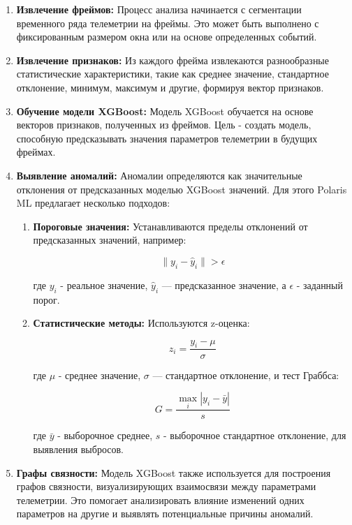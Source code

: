\documentclass[14pt, a4paper]{../cls/coursework}
\begin{document}
    \begin{enumerate}[label=\arabic*.]
        \item \textbf{Извлечение фреймов:} Процесс анализа начинается с сегментации временного ряда телеметрии на фреймы.
        Это может быть выполнено с фиксированным размером окна или на основе определенных событий.
        \item \textbf{Извлечение признаков:} Из каждого фрейма извлекаются разнообразные статистические характеристики, такие как среднее значение, стандартное отклонение, минимум, максимум и другие, формируя вектор признаков.
        \item \textbf{Обучение модели XGBoost:} Модель XGBoost обучается на основе векторов признаков, полученных из фреймов.
        Цель - создать модель, способную предсказывать значения параметров телеметрии в будущих фреймах.
        \item \textbf{Выявление аномалий:} Аномалии определяются как значительные отклонения от предсказанных моделью XGBoost значений.
        Для этого Polaris ML предлагает несколько подходов:
        \begin{enumerate}[label=\alph*.]
            \item \textbf{Пороговые значения:} Устанавливаются пределы отклонений от предсказанных значений, например:

            \[\| y_i - \hat{y}_i \| > \epsilon\]

            где $y_i$ - реальное значение, $\hat{y}_i$ — предсказанное значение, а $\epsilon$ - заданный порог.
            \item \textbf{Статистические методы:} Используются z-оценка:

            \[z_i = \frac{y_i - \mu}{\sigma}\]

            где $\mu$ - среднее значение, $\sigma$ — стандартное отклонение, и тест Граббса:

            \[G = \frac{\max_{i}|y_i - \bar{y}|}{s}\]

            где $\bar{y}$ - выборочное среднее, $s$ - выборочное стандартное отклонение, для выявления выбросов.
        \end{enumerate}
        \item \textbf{Графы связности:} Модель XGBoost также используется для построения графов связности, визуализирующих взаимосвязи между параметрами телеметрии.
        Это помогает анализировать влияние изменений одних параметров на другие и выявлять потенциальные причины аномалий.
    \end{enumerate}
\end{document}
